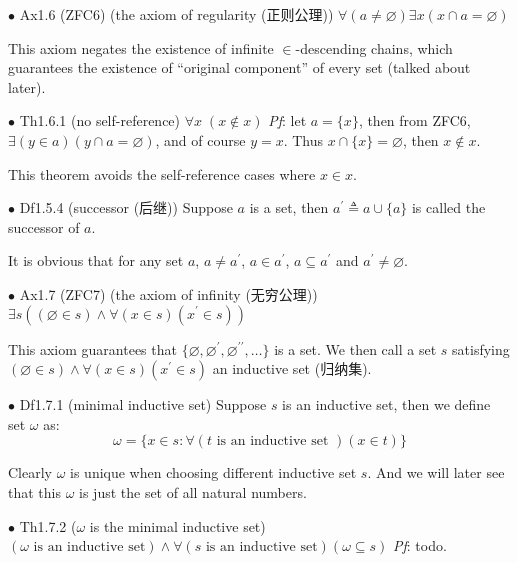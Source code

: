 \documentclass{article}
\begin{document}
\begin{Ax}{$\bullet$ Ax1.6 (ZFC6) (the axiom of regularity (正则公理))}
    \textcolor{Ax}{$\forall (a\neq \varnothing)\exists x\left(x\cap a = \varnothing\right)$}
\end{Ax}
This axiom negates the existence of infinite $\in$-descending chains, which guarantees the existence of ``original component'' of every set (talked about later). 

\begin{Th}{$\bullet$ Th1.6.1 (no self-reference)}
    \textcolor{Th}{$\forall x \;(x\notin x)$}
    \tcblower
    \textit{Pf}: let $a = \{x\}$, then from ZFC6, $\exists (y\in a)(y\cap a = \varnothing)$, and of course $y = x$. Thus $x\cap \{x\} = \varnothing$, then $x\notin x$.
\end{Th}
This theorem avoids the self-reference cases where $x\in x$.

\begin{Df}{$\bullet$ Df1.5.4 (successor (后继))}
    Suppose $a$ is a set, then $a^\prime \triangleq a\cup \{a\}$ is called the successor of $a$.
\end{Df}
\textcolor{Th}{It is obvious that for any set $a$, $a\neq a^\prime$, $a\in a^\prime$, $a\subseteq a^\prime$ and $a^\prime \neq \varnothing$.}

\begin{Ax}{$\bullet$ Ax1.7 (ZFC7) (the axiom of infinity (无穷公理))}
    \textcolor{Ax}{$\exists s \left((\varnothing\in s)\land \forall (x\in s) (x^\prime\in s)\right)$}
\end{Ax}
This axiom guarantees that $\{\varnothing, \varnothing^\prime, \varnothing^{\prime\prime}, \dots\}$ is a set. We then call a set $s$ satisfying $(\varnothing\in s)\land \forall (x\in s) (x^\prime\in s)$ an inductive set (归纳集).

\begin{Df}{$\bullet$ Df1.7.1 (minimal inductive set)}
    Suppose $s$ is an inductive set, then we define set $\omega$ as:
    $$\omega = \{x\in s: \forall (t \text{ is an inductive set }) (x\in t)\}$$
\end{Df}
\textcolor{Th}{Clearly $\omega$ is unique when choosing different inductive set $s$.} And we will later see that this $\omega$ is just the set of all natural numbers.

\begin{Th}{$\bullet$ Th1.7.2 ($\omega$ is the minimal inductive set)}
    \textcolor{Th}{$\left(\omega \text{ is an inductive set}\right)\land \forall (s\text{ is an inductive set}) (\omega\subseteq s)$}
    \tcblower
    \textit{Pf}: todo.
\end{Th}
\end{document}

